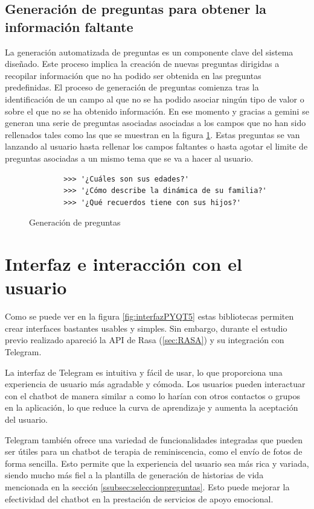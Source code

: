 \subsection{Generación de preguntas para obtener la información faltante}
La generación automatizada de preguntas es un componente clave del sistema diseñado. Este proceso implica la creación de nuevas preguntas dirigidas a recopilar información que no ha podido ser obtenida en las preguntas predefinidas. El proceso de generación de preguntas comienza tras la identificación de un campo al que no se ha podido asociar ningún tipo de valor o sobre el que no se ha obtenido información. En ese momento y gracias a gemini se generan una serie de preguntas asociadas asociadas a los campos que no han sido rellenados tales como las que se muestran en la figura \ref{fig:generacionPreguntas}. Estas preguntas se van lanzando al usuario hasta rellenar los campos faltantes o hasta agotar el limite de preguntas asociadas a un mismo tema que se va a hacer al usuario. 
\begin{figure}[h]
	\centering
	\begin{verbatim}
		>>>	'¿Cuáles son sus edades?'
		>>> '¿Cómo describe la dinámica de su familia?'
		>>> '¿Qué recuerdos tiene con sus hijos?'
	\end{verbatim}
	\caption{Generación de preguntas}
	\label{fig:generacionPreguntas}
\end{figure}
\section{Interfaz e interacción con el usuario}
Como se puede ver en la figura \ref{fig:interfazPYQT5} estas bibliotecas permiten crear interfaces bastantes usables y simples. Sin embargo, durante el estudio previo realizado apareció la API de Rasa (\ref{sec:RASA}) y su integración con Telegram.

La interfaz de Telegram es intuitiva y fácil de usar, lo que proporciona una experiencia de usuario más agradable y cómoda. Los usuarios pueden interactuar con el chatbot de manera similar a como lo harían con otros contactos o grupos en la aplicación, lo que reduce la curva de aprendizaje y aumenta la aceptación del usuario.

Telegram también ofrece una variedad de funcionalidades integradas que pueden ser útiles para un chatbot de terapia de reminiscencia, como el envío de fotos de forma sencilla. Esto permite que la experiencia del usuario sea más rica y variada, siendo mucho más fiel a la plantilla de generación de historias de vida mencionada en la sección \ref{ssubsec:seleccionpreguntas}. Esto puede mejorar la efectividad del chatbot en la prestación de servicios de apoyo emocional.

